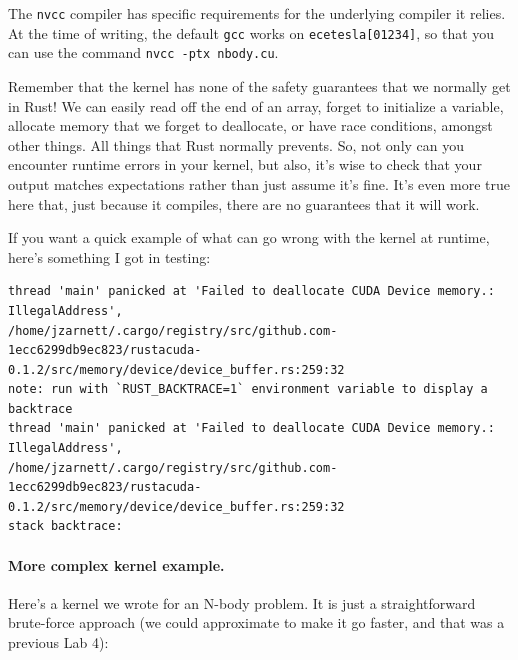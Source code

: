 \documentclass[a4paper]{report}
\begin{document}
The \texttt{nvcc} compiler has specific requirements for the underlying compiler it relies. At the time of writing, the default \texttt{gcc} works on \texttt{ecetesla[01234]}, so that you can use the command \texttt{nvcc -ptx nbody.cu}.

Remember that the kernel has none of the safety guarantees that we normally get in Rust! We can easily read off the end of an array, forget to initialize a variable, allocate memory that we forget to deallocate, or have race conditions, amongst other things. All things that Rust normally prevents. So, not only can you encounter runtime errors in your kernel, but also, it's wise to check that your output matches expectations rather than just assume it's fine. It's even more true here that, just because it compiles, there are no guarantees that it will work.

If you want a quick example of what can go wrong with the kernel at runtime, here's something I got in testing:
{\scriptsize
\begin{verbatim}
thread 'main' panicked at 'Failed to deallocate CUDA Device memory.: IllegalAddress', 
/home/jzarnett/.cargo/registry/src/github.com-1ecc6299db9ec823/rustacuda-0.1.2/src/memory/device/device_buffer.rs:259:32
note: run with `RUST_BACKTRACE=1` environment variable to display a backtrace
thread 'main' panicked at 'Failed to deallocate CUDA Device memory.: IllegalAddress', 
/home/jzarnett/.cargo/registry/src/github.com-1ecc6299db9ec823/rustacuda-0.1.2/src/memory/device/device_buffer.rs:259:32
stack backtrace:
\end{verbatim}
}

\paragraph{More complex kernel example.} Here's a kernel we wrote for an N-body problem. It is just a straightforward brute-force approach (we could approximate to make it go faster, and that was a previous Lab 4):
\end{document}

